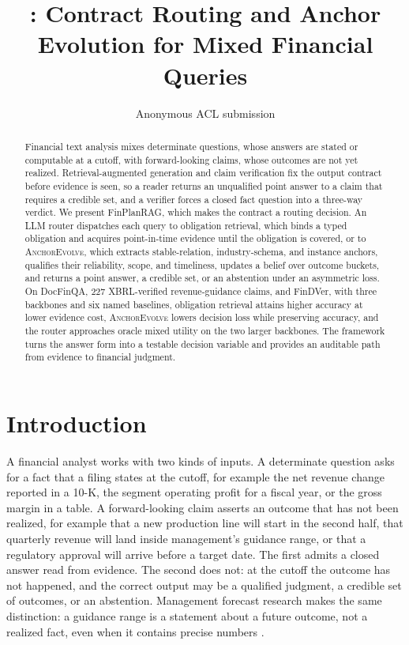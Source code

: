 \documentclass[11pt]{article}
\title{\method: Contract Routing and Anchor Evolution for Mixed Financial Queries}
\author{Anonymous ACL submission}
\newcommand{\method}{FinPlanRAG}
\newcommand{\anchor}{\textsc{AnchorEvolve}}
\begin{document}
\maketitle

\begin{abstract}
Financial text analysis mixes determinate questions, whose answers are stated or computable at a cutoff, with forward-looking claims, whose outcomes are not yet realized. Retrieval-augmented generation and claim verification fix the output contract before evidence is seen, so a reader returns an unqualified point answer to a claim that requires a credible set, and a verifier forces a closed fact question into a three-way verdict. We present \method, which makes the contract a routing decision. An LLM router dispatches each query to obligation retrieval, which binds a typed obligation and acquires point-in-time evidence until the obligation is covered, or to \anchor, which extracts stable-relation, industry-schema, and instance anchors, qualifies their reliability, scope, and timeliness, updates a belief over outcome buckets, and returns a point answer, a credible set, or an abstention under an asymmetric loss. On DocFinQA, 227 XBRL-verified revenue-guidance claims, and FinDVer, with three backbones and six named baselines, obligation retrieval attains higher accuracy at lower evidence cost, \anchor{} lowers decision loss while preserving accuracy, and the router approaches oracle mixed utility on the two larger backbones. The framework turns the answer form into a testable decision variable and provides an auditable path from evidence to financial judgment.
\end{abstract}

\section{Introduction}

A financial analyst works with two kinds of inputs. A determinate question asks for a fact that a filing states at the cutoff, for example the net revenue change reported in a 10-K, the segment operating profit for a fiscal year, or the gross margin in a table. A forward-looking claim asserts an outcome that has not been realized, for example that a new production line will start in the second half, that quarterly revenue will land inside management's guidance range, or that a regulatory approval will arrive before a target date. The first admits a closed answer read from evidence. The second does not: at the cutoff the outcome has not happened, and the correct output may be a qualified judgment, a credible set of outcomes, or an abstention. Management forecast research makes the same distinction: a guidance range is a statement about a future outcome, not a realized fact, even when it contains precise numbers \citep{hirst2008management}.
\end{document}
